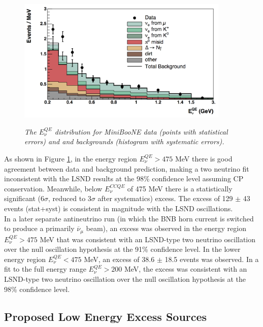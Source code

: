 \begin{figure}[ht!]
\centering
	\includegraphics[width=0.9\textwidth]{Figures/MB_published_stackedhisto.png} \\
\caption{\textit{The $E_\nu^{QE}$ distribution for MiniBooNE data (points with statistical errors) and and backgrounds (histogram with systematic errors).}}\label{MB_published_stackedhisto_fig}
\end{figure}


As shown in Figure \ref{MB_published_stackedhisto_fig}, in the energy region $E_\nu^{QE} > 475$ MeV there is good agreement between data and background prediction, making a two neutrino fit inconsistent with the LSND results at the 98\% confidence level assuming CP conservation. Meanwhile, below $E_\nu^{CCQE}$ of 475 MeV there is a statistically significant (6$\sigma$, reduced to 3$\sigma$ after systematics) excess. The excess of 129 $\pm$ 43 events (stat+syst) is consistent in magnitude with the LSND oscillations.\\


In a later separate antineutrino run (in which the BNB horn current is switched to produce a primarily $\overline{\nu}_\mu$ beam), an excess was observed in the energy region $E_\nu^{QE} > 475$ MeV that was consistent with an LSND-type two neutrino oscillation over the null oscillation hypothesis at the 91\% confidence level. In the lower energy region $E_\nu^{QE} < 475$ MeV, an excess of 38.6 $\pm$ 18.5 events was observed. In a fit to the full energy range $E_\nu^{QE} > 200$ MeV, the excess was consistent with an LSND-type two neutrino oscillation over the null oscillation hypothesis at the 98\% confidence level.\\


\subsection{Proposed Low Energy Excess Sources}


